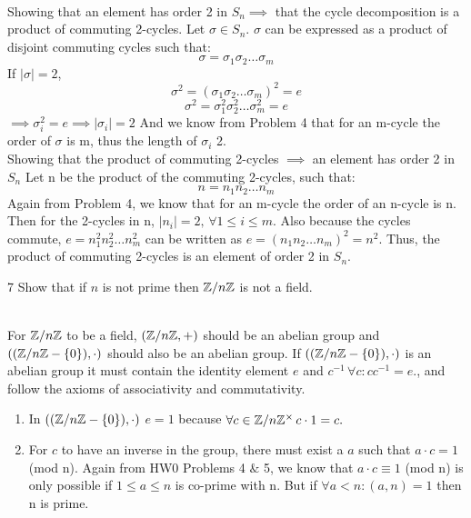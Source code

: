 \documentclass[12pt]{article}
\begin{document}
\begin{solution}
    \bbni \\
    Showing that an element has order 2 in $S_n \implies$ that the cycle decomposition is a product of commuting 2-cycles. 
    \bbni 
    Let $\sigma \in S_n$. $\sigma$ can be expressed as a product of disjoint commuting cycles such that: 
    \[\sigma = \sigma_1\sigma_2\ldots\sigma_m\]
    If $\mid \sigma \mid = 2$, 
    \[\sigma^2 = (\sigma_1 \sigma_2\ldots \sigma_m)^2= e\]
    \[\sigma^2 = \sigma_1^2 \sigma_2^2\ldots \sigma_m^2 = e\]
    $\implies \sigma_i^2 = e \implies\mid \sigma_i \mid = 2$
    And we know from Problem 4 that for an m-cycle the order of $\sigma$ is m, thus the length of $\sigma_i$ 2.  \\ 
    
    Showing that the product of commuting 2-cycles $\implies$ an element has order 2 in $S_n$
    Let n be the product of the commuting 2-cycles, such that: 
    \[n = n_1n_2\ldots n_m\]
    Again from Problem 4, we know that for an m-cycle the order of an n-cycle is n. Then for the 2-cycles in n, $\mid n_i \mid = 2, \, \forall 1 \leq i \leq m$. 
    Also because the cycles commute, $e = n_1^2n_2^2\ldots n_m^2$ can be written as $e = (n_1n_2\ldots n_m)^2 = n^2.$
    Thus, the product of commuting 2-cycles is an element of order 2 in $S_n$. 
\end{solution}
\bbni 
\begin{problem}{7}
    Show that if $n$ is not prime then $\mathbb Z /n \mathbb Z$ is not a field. 
\end{problem}

\begin{solution}
\bbni \\
For $\mathbb Z/n\mathbb Z$ to be a field, $(\mathbb Z/n\mathbb Z, +)$ should be an abelian group and $((\mathbb Z/n\mathbb Z - \{0\}), \cdot)$ should also be an abelian group. If $((\mathbb Z/n\mathbb Z - \{0\}), \cdot)$ is an abelian group it must contain the identity element $e$ and $c^{-1} \, \forall c: cc^{-1} = e.$, and follow the axioms of associativity and commutativity. 
\begin{enumerate}
    \item In $((\mathbb Z/n\mathbb Z - \{0\}), \cdot)$ $e = 1$ because $\forall c \in \mathbb Z/n\mathbb Z^\times \, c \cdot 1 = c.$ 
    \item For $c$ to have an inverse in the group, there must exist a $a$ such that $a \cdot c = 1$ (mod n). 
    Again from HW0 Problems 4 $\&$ 5, we know that $a \cdot c \equiv 1$ (mod n) is only possible if $1 \leq a \leq n$ is co-prime with n. But if $\forall a < n: (a, n) = 1$ then n is prime. 
\end{enumerate}
\end{solution}
\end{document}
